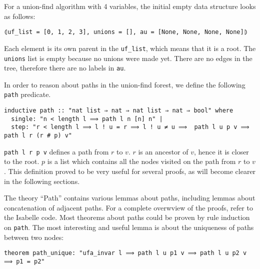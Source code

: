 \begin{exmp}\label{empty_ufe}
For a union-find algorithm with 4 variables, the initial empty data structure looks as follows:
\begin{lstlisting}
⦇uf_list = [0, 1, 2, 3], unions = [], au = [None, None, None, None]⦈
\end{lstlisting}
Each element is its own parent in the \lstinline{uf_list}, which means that it is a root. The \lstinline{unions} list is empty because no unions were made yet.
There are no edges in the tree, therefore there are no labels in \lstinline{au}.
\end{exmp}

In order to reason about paths in the union-find forest, we define the following \lstinline{path} predicate.

\begin{lstlisting}
inductive path :: "nat list ⇒ nat ⇒ nat list ⇒ nat ⇒ bool" where
  single: "n < length l ⟹ path l n [n] n" |
  step: "r < length l ⟹ l ! u = r ⟹ l ! u ≠ u ⟹  path l u p v ⟹ path l r (r # p) v"
\end{lstlisting}

\lstinline{path l r p v} defines a path from $r$ to $v$. $r$ is an ancestor of $v$, hence it is closer to the root. $p$ is a list which contains all the nodes visited on the path from $r$ to $v$. This definition proved to be very useful for several proofs, as will become clearer in the following sections.

The theory ``Path'' contains various lemmas about paths, including lemmas about concatenation of adjacent paths.
For a complete overwview of the proofs, refer to the Isabelle code.
Most theorems about paths could be proven by rule induction on \lstinline{path}.
The most interesting and useful lemma is about the uniqueness of paths between two nodes:

\begin{lstlisting}
theorem path_unique: "ufa_invar l ⟹ path l u p1 v ⟹ path l u p2 v ⟹ p1 = p2"
\end{lstlisting}

